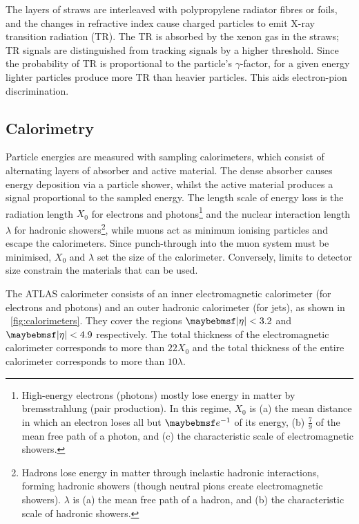 \begin{description}
	The layers of straws are interleaved with polypropylene radiator fibres or foils, and 
	the changes in refractive index cause charged particles to emit X-ray transition 
	radiation (TR). The TR is absorbed by the xenon gas in the straws; TR signals are 
	distinguished from tracking signals by a higher threshold. Since the probability of 
	TR is proportional to the particle's $\gamma$-factor, for a given energy lighter 
	particles produce more TR than heavier particles. This aids electron-pion 
	discrimination.
\end{description}



\subsection{Calorimetry}
\label{sec:atlas:calo}

Particle energies are measured with sampling calorimeters, which consist of alternating 
layers of absorber and active material. The dense absorber causes energy deposition 
via a particle shower, whilst the active material produces a signal proportional to the 
sampled energy. The length scale of energy loss is the radiation length $X_0$ for 
electrons and photons\footnote{
	High-energy electrons (photons) mostly lose energy in matter by bremsstrahlung 
	(\epluseminus pair production). In this regime, $X_0$ is (a) the mean distance in 
	which an electron loses all but $\eexp{-1}$ of its energy, (b) $\tfrac{7}{9}$ of the 
	mean free path of a photon, and (c) the characteristic scale of electromagnetic 
	showers.
} and the nuclear interaction length $\lambda$ for hadronic showers\footnote{
	Hadrons lose energy in matter through inelastic hadronic interactions, forming hadronic showers (though neutral pions create electromagnetic showers). $\lambda$ is 
	(a) the mean free path of a hadron, and (b) the characteristic scale of hadronic showers.
}, while muons act as minimum ionising particles and escape the calorimeters. Since 
punch-through into the muon system must be minimised, $X_0$ and $\lambda$ set the size of 
the calorimeter. Conversely, limits to detector size constrain the materials that can be
used.

The ATLAS calorimeter consists of an inner electromagnetic calorimeter (for electrons and 
photons) and an outer hadronic calorimeter (for jets), as shown in 
\Figure~\ref{fig:calorimeters}. They cover the regions $\mods{\eta} < 3.2$ and 
$\mods{\eta} < 4.9$ respectively. The total thickness of the electromagnetic calorimeter 
corresponds to more than $22 X_0$ and the total thickness of the entire calorimeter 
corresponds to more than $10 \lambda$.


